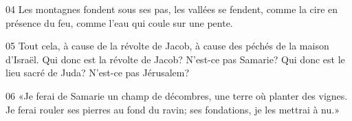 
04 Les montagnes fondent sous ses pas, les vallées se fendent, comme la cire en présence du feu, comme l’eau qui coule sur une pente.

05 Tout cela, à cause de la révolte de Jacob, à cause des péchés de la maison d’Israël. Qui donc est la révolte de Jacob? N’est-ce pas Samarie? Qui donc est le lieu sacré de Juda? N’est-ce pas Jérusalem?

06 «Je ferai de Samarie un champ de décombres, une terre où planter des vignes. Je ferai rouler ses pierres au fond du ravin; ses fondations, je les mettrai à nu.»
